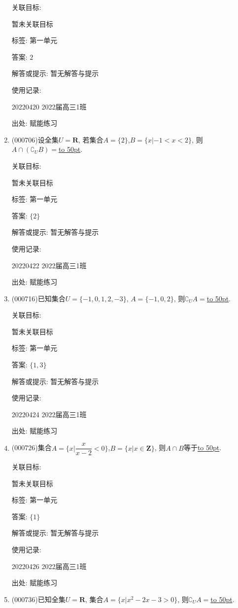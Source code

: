 \documentclass[10pt,a4paper]{article}
\newcommand{\blank}[1]{\underline{\hbox to #1pt{}}}
\begin{document}
\begin{enumerate}[1.]
关联目标:

暂未关联目标



标签: 第一单元

答案: $2$

解答或提示: 暂无解答与提示

使用记录:

20220420	2022届高三1班	


出处: 赋能练习
\item { (000706)}设全集$U=\mathbf{R}$, 若集合$A=\{2\}$,$B=\{x|-1<x<2\}$, 则$A\cap (\complement_UB)=$\blank{50}.


关联目标:

暂未关联目标



标签: 第一单元

答案: $\{2\}$

解答或提示: 暂无解答与提示

使用记录:

20220422	2022届高三1班	


出处: 赋能练习
\item { (000716)}已知集合$U=\{-1,0,1,2,-3\}$, $A=\{-1,0,2\}$, 则$\complement_U A=$\blank{50}.


关联目标:

暂未关联目标



标签: 第一单元

答案: $\{1,3\}$

解答或提示: 暂无解答与提示

使用记录:

20220424	2022届高三1班	


出处: 赋能练习
\item { (000726)}集合$A=\{x|\dfrac x{x-2}<0\}$,$B=\{x|x\in \mathbf{Z}\}$, 则$A\cap B$等于\blank{50}.


关联目标:

暂未关联目标



标签: 第一单元

答案: $\{1\}$

解答或提示: 暂无解答与提示

使用记录:

20220426	2022届高三1班	


出处: 赋能练习
\item { (000736)}已知全集$U=\mathbf{R}$, 集合$A=\{x|x^2-2x-3>0\}$, 则$\complement_U A=$\blank{50}.



\end{enumerate}
\end{document}
